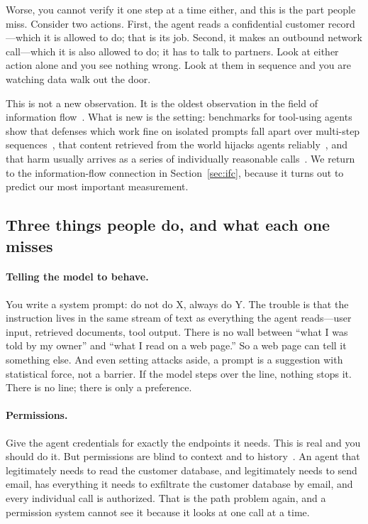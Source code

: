 \documentclass[11pt]{article}
\begin{document}
Worse, you cannot verify it one step at a time either, and this is the part
people miss. Consider two actions. First, the agent reads a confidential
customer record---which it is allowed to do; that is its job. Second, it makes
an outbound network call---which it is also allowed to do; it has to talk to
partners. Look at either action alone and you see nothing wrong. Look at them
in sequence and you are watching data walk out the door.

This is not a new observation. It is the oldest observation in the field of
information flow~\cite{denning1976,goguen1982}. What is new is the setting:
benchmarks for tool-using agents show that defenses which work fine on
isolated prompts fall apart over multi-step
sequences~\cite{agentdojo,agentharm}, that content retrieved from the world
hijacks agents reliably~\cite{greshake2023,injecagent}, and that harm usually
arrives as a series of individually reasonable calls~\cite{toolemu}. We
return to the information-flow connection in Section~\ref{sec:ifc}, because it
turns out to predict our most important measurement.

\subsection{Three things people do, and what each one misses}

\paragraph{Telling the model to behave.} You write a system prompt: do not do
X, always do Y. The trouble is that the instruction lives in the same stream
of text as everything the agent reads---user input, retrieved documents, tool
output. There is no wall between ``what I was told by my owner'' and ``what I
read on a web page.'' So a web page can tell it something else. And even
setting attacks aside, a prompt is a suggestion with statistical force, not a
barrier. If the model steps over the line, nothing stops it. There is no line;
there is only a preference.

\paragraph{Permissions.} Give the agent credentials for exactly the endpoints
it needs. This is real and you should do it. But permissions are blind to
context and to history~\cite{sp800207}. An agent that legitimately needs to
read the customer database, and legitimately needs to send email, has
everything it needs to exfiltrate the customer database by email, and every
individual call is authorized. That is the path problem again, and a
permission system cannot see it because it looks at one call at a time.
\end{document}
